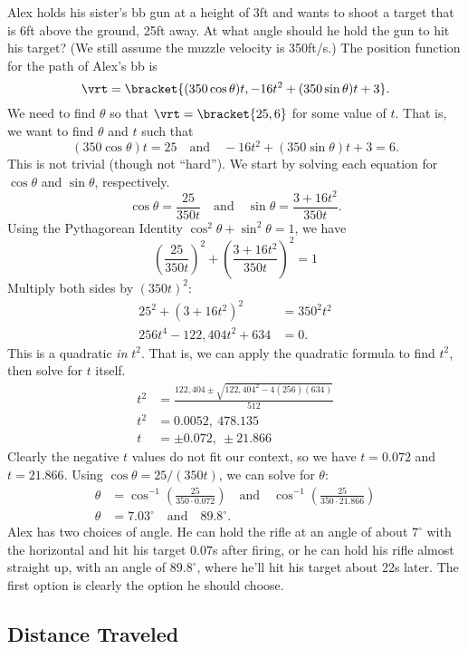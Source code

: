 \begin{example}\label{ex_motion61}
Alex holds his sister's bb gun at a height of 3ft and wants to shoot a target that is 6ft above the ground, 25ft away. At what angle should he hold the gun to hit his target? (We still assume the muzzle velocity is 350ft/s.)
\solution
The position function for the path of Alex's bb is
\[\vrt =\bracket{(350\cos \theta)t, -16t^2+(350\sin\theta)t+3}.\]
We need to find $\theta$ so that $\vrt =\bracket{25,6}$ for some value of $t$. That is, we want to find $\theta$ and $t$ such that 
\[(350\cos\theta)t = 25 \quad \text{and}\quad -16t^2+(350\sin\theta)t+3 = 6.\]
This is not trivial (though not ``hard''). We start by solving each equation for $\cos\theta$ and $\sin \theta$, respectively.
\[\cos\theta = \frac{25}{350t} \quad \text{and} \quad \sin\theta = \frac{3+16t^2}{350t}.\]
Using the Pythagorean Identity $\cos^2\theta+\sin^2\theta=1$, we have
\[\left(\frac{25}{350t}\right)^2 + \left(\frac{3+16t^2}{350t}\right)^2 =1\]
Multiply both sides by $(350t)^2$:
\begin{align*}
25^2 + (3+16t^2)^2 &=350^2t^2\\
256t^4-122,404t^2+634 &=0.
\end{align*}
This is a quadratic \emph{in} $t^2$. That is, we can apply the quadratic formula  to find $t^2$, then solve for $t$ itself.
\begin{align*}
t^2 &= \frac{122,404\pm\sqrt{122,404^2-4(256)(634)}}{512}\\
t^2 &= 0.0052,\ 478.135\\
t &=  \pm 0.072,\ \pm 21.866
\end{align*}
Clearly the negative $t$ values do not fit our context, so we have $t=0.072$ and $t=21.866$. Using $\cos \theta = 25/(350 t)$, we can solve for $\theta$:
\begin{align*}
\theta &= \cos^{-1}\left(\frac{25}{350\cdot 0.072}\right)\quad \text{and}\quad \cos^{-1}\left(\frac{25}{350\cdot 21.866}\right)\\
\theta &= 7.03^\circ \quad \text{and} \quad 89.8^\circ.
\end{align*}
Alex has two choices of angle. He can hold the rifle at an angle of about $7^\circ$ with the horizontal and hit his target $0.07$s after firing, or he can hold his rifle almost straight up, with an angle of $89.8^\circ$, where he'll hit his target about 22s later. The first option is clearly the option he should choose.
\end{example}

\subsection{Distance Traveled}

